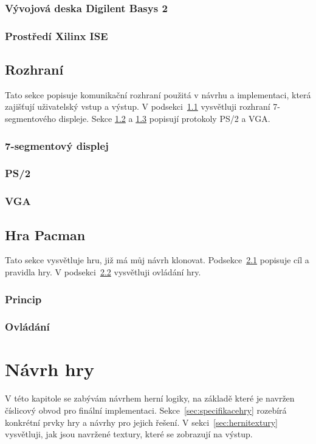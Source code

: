 \documentclass{report}
\begin{document}
\subsection{Vývojová deska Digilent Basys 2}\label{sec:basys2}
\subsection{Prostředí Xilinx ISE}\label{sec:xilinxise}

\section{Rozhraní}\label{sec:rozhrani}
Tato sekce popisuje komunikační rozhraní použitá v návrhu a implementaci, která zajišťují uživatelský vstup a výstup. V podsekci~\ref{sec:7segment} vysvětluji rozhraní 7-segmentového displeje. Sekce  \ref{sec:ps2} a \ref{sec:vga} popisují protokoly PS/2 a VGA.
\subsection{7-segmentový displej}\label{sec:7segment}
\subsection{PS/2}\label{sec:ps2}
\subsection{VGA}\label{sec:vga}

\section{Hra Pacman}\label{sec:hrapacman}
Tato sekce vysvětluje hru, již má můj návrh klonovat. Podsekce~\ref{sec:principhry} popisuje cíl a pravidla hry. V podsekci~\ref{sec:ovladanihry} vysvětluji ovládání hry.
\subsection{Princip}\label{sec:principhry}
\subsection{Ovládání}\label{sec:ovladanihry}

\chapter{Návrh hry}
V této kapitole se zabývám návrhem herní logiky, na základě které je navržen číslicový obvod pro finální implementaci. Sekce~\ref{sec:specifikacehry} rozebírá konkrétní prvky hry a návrhy pro jejich řešení. V sekci~\ref{sec:hernitextury} vysvětluji, jak jsou navržené textury, které se zobrazují na výstup.
\end{document}
